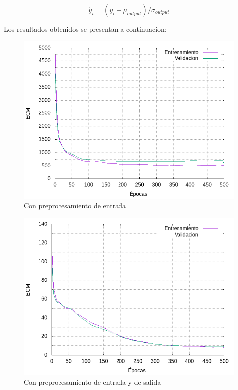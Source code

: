 \begin{equation}
  \dot{y_{i}} = (y_{i} - \mu_{output}) / \sigma_{output}
\end{equation}

Los resultados obtenidos se presentan a continuacion:

\begin{figure}[H]
  \includegraphics[width=125mm]{imagenes/ej2/ex_1-1_red-9-17-2_errors.png}
  \caption{Con preprocesamiento de entrada}
\end{figure}

\begin{figure}[H]
  \includegraphics[width=125mm]{imagenes/ej2/ex_1-2_red-9-17-2_errors.png}
  \caption{Con preprocesamiento de entrada y de salida}
\end{figure}

